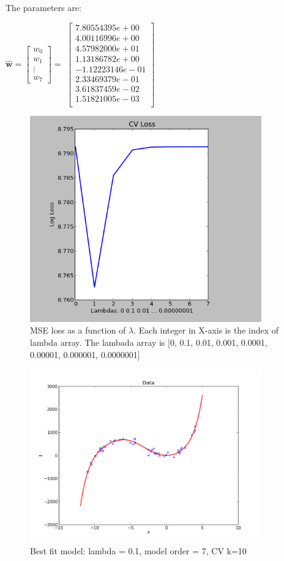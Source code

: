 \documentclass[10pt]{article}
\begin{document}
\begin{itemize}
The parameters are:

$\mathbf{ \hat{w} }=\begin{bmatrix}
w_{0}\\
w_{1}\\
\vdots \\
w_{7}
\end{bmatrix} = $
$\begin{bmatrix}
7.80554395e+00\\
4.00116996e+00\\
4.57982000e+01\\
1.13186782e+00\\
-1.12223146e-01   \\
2.33469379e-01\\
3.61837459e-02\\
1.51821005e-03\\
\end{bmatrix}$

        
\begin{figure}[htb]
\begin{center}
\includegraphics[width=10cm]{figs/figure_8b.png}
\caption{MSE loss as a function of $\lambda$. Each integer in X-axis is the index of lambda array. The lambada array is [0, 0.1, 0.01, 0.001, 0.0001, 0.00001, 0.000001, 0.0000001]}
\end{center}
\end{figure}


\begin{figure}[htb]
\begin{center}
\includegraphics[width=10cm]{figs/figure_8.png}
\caption{Best fit model: lambda = 0.1, model order = 7, CV k=10}
\end{center}
\end{figure}
\end{itemize}
\end{document}
